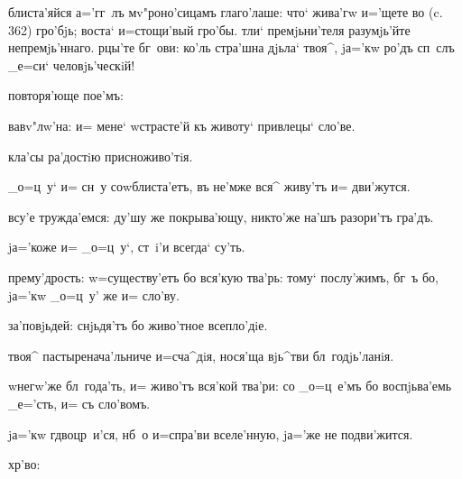 
блиста'яйся а='гг~лъ мv"роно'сицамъ глаго'лаше: что` 
жива'гw и='щете во (c. 362) гро'бjь; воста` и=стощи'вый 
гро'бы. тли` премjьни'теля разумjь'йте непремjь'ннаго. 
рцы'те бг~ови: ко'ль стра'шна дjьла` твоя^, jа='кw ро'дъ 
сп~слъ _е=си` человjь'ческiй!

повторя'юще пое'мъ:%

вавv"лw'на: и= мене` w\т страсте'й къ животу` привлецы` 
сло'ве.

кла'сы ра'достiю присноживо'тiя.

_о=ц~у` и= сн~у соwблиста'етъ, въ не'мже вся^ живу'тъ и= 
дви'жутся.


всу'е тружда'емся: ду'шу же покрыва'ющу, никто'же на'шъ 
разори'тъ гра'дъ.

jа='коже и= _о=ц~у`, ст~i'и всегда` су'ть.

прему'дрость: w=существу'етъ бо вся'кую тва'рь: тому` 
послу'жимъ, бг~ъ бо, jа='кw _о=ц~у' же и= сло'ву.



за'повjьдей: снjьдя'тъ бо живо'тное всепло'дiе.

твоя^ пастыренача'льниче и=сча^дiя, нося'ща вjь^тви 
бл~годjь'ланiя.

w\т негw'же бл~года'ть, и= живо'тъ вся'кой тва'ри: со 
_о=ц~е'мъ бо воспjьва'емь _е='сть, и= съ сло'вомъ.


jа='кw гд воцр~и'ся, нб~о и=спра'ви вселе'нную, jа='же 
не подви'жится.


хр'во: %

